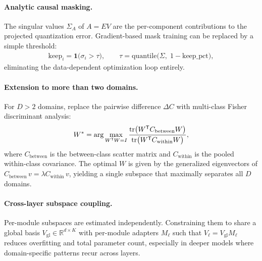 \documentclass[11pt,a4paper]{article}
\begin{document}
\paragraph{Analytic causal masking.}
The singular values $\Sigma_A$ of $A = E V$ are the
per-component contributions to the projected quantization error.
Gradient-based mask training can be replaced by a simple threshold:
\begin{align}
  \text{keep}_i = \mathbf{1}\bigl( \sigma_i > \tau \bigr),
  \qquad
  \tau = \text{quantile}\bigl(\Sigma,\; 1 - \text{keep\_pct}\bigr),
\end{align}
eliminating the data-dependent optimization loop entirely.

\paragraph{Extension to more than two domains.}
For $D > 2$ domains, replace the pairwise difference $\Delta C$ with
multi-class Fisher discriminant analysis:
\begin{align}
  W^* = \arg\max_{W^{\mathsf{T}} W = I}
  \frac{\tr\bigl( W^{\mathsf{T}} C_{\text{between}} W \bigr)}
       {\tr\bigl( W^{\mathsf{T}} C_{\text{within}} W \bigr)},
\end{align}
where $C_{\text{between}}$ is the between-class scatter matrix and
$C_{\text{within}}$ is the pooled within-class covariance.  The
optimal $W$ is given by the generalized eigenvectors of
$C_{\text{between}}\, v = \lambda C_{\text{within}}\, v$, yielding a
single subspace that maximally separates all $D$ domains.

\paragraph{Cross-layer subspace coupling.}
Per-module subspaces are estimated independently.  Constraining them
to share a global basis $V_{\text{gl}} \in \mathbb{R}^{d \times K}$
with per-module adapters $M_{\ell}$ such that
$V_{\ell} = V_{\text{gl}} M_{\ell}$ reduces overfitting and total
parameter count, especially in deeper models where domain-specific
patterns recur across layers.
\end{document}
